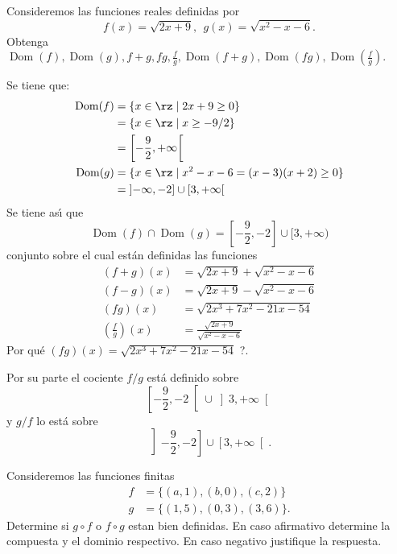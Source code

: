 \begin{example}
Consideremos las funciones reales definidas por
\[
f(x)=\sqrt{2x+9},\ \ g(x)=\sqrt{x^{2}-x-6}.
\]
Obtenga $\operatorname*{Dom}\left(  f\right)  ,\operatorname*{Dom}\left(
g\right)  ,f+g,fg,\frac{f}{g},\operatorname*{Dom}\left(  f+g\right)
,\operatorname*{Dom}\left(  fg\right)  ,\operatorname*{Dom}\left(  \frac{f}%
{g}\right)  .$
\end{example}

\begin{sol}
Se tiene que:
\begin{align*}
\operatorname*{Dom}(f)  &  =\{x\in\rz\mid2x+9\geq0\}\\
&  =\{x\in\rz\mid x\geq-9/2\}\\
&  =\left[  -\frac{9}{2},+\infty\right[ \\
\operatorname*{Dom}(g)  &  =\{x\in\rz\mid x^{2}-x-6=(x-3)(x+2)\geq0\}\\
&  =\left]  -\infty,-2\right]  \cup\left[  3,+\infty\right[
\end{align*}
Se tiene as\'{\i} que
\[
\operatorname*{Dom}(f)\cap\operatorname*{Dom}(g)=\left[  -\frac{9}%
{2},-2\right]  \cup\lbrack3,+\infty)
\]
conjunto sobre el cual est\'{a}n definidas las funciones
\begin{align*}
(f+g)(x)  &  =\sqrt{2x+9}+\sqrt{x^{2}-x-6}\\
(f-g)(x)  &  =\sqrt{2x+9}-\sqrt{x^{2}-x-6}\\
(fg)(x)  &  =\sqrt{2x^{3}+7x^{2}-21x-54}\\
\left(  \frac{f}{g}\right)  \left(  x\right)   &  =\frac{\sqrt{2x+9}}%
{\sqrt{x^{2}-x-6}}%
\end{align*}
\textquestiondown Por qu\'{e} $\left(  fg\right)  \left(  x\right)
=\sqrt{2x^{3}+7x^{2}-21x-54}$ ?.

Por su parte el cociente $f/g$ est\'{a} definido sobre
\[
\left[  -\frac{9}{2},-2\right[  \cup\left]  3,+\infty\right[
\]
y $g/f$ lo est\'{a} sobre
\[
\left]  -\frac{9}{2},-2\right]  \cup\left[  3,+\infty\right[  .
\]



\end{sol}

\begin{example}
Consideremos las funciones finitas
\begin{align*}
f  &  =\{(a,1),(b,0),(c,2)\}\\
g  &  =\{(1,5),(0,3),(3,6)\}.
\end{align*}
Determine si $g\circ f$ o $f\circ g$ estan bien definidas. En caso afirmativo
determine la compuesta y el dominio respectivo. En caso negativo justifique la respuesta.
\end{example}

